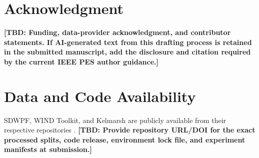 \documentclass[journal]{IEEEtran}
\newcommand{\TBD}[1]{\textbf{[TBD: #1]}}
\newcommand{\1}{\mathbb{I}}
\begin{document}
\section*{Acknowledgment}
\TBD{Funding, data-provider acknowledgment, and contributor statements. If AI-generated text from this drafting process is retained in the submitted manuscript, add the disclosure and citation required by the current IEEE PES author guidance.}

\section*{Data and Code Availability}
SDWPF, WIND Toolkit, and Kelmarsh are publicly available from their respective repositories \cite{zhou2024sdwpf,draxl2015windtoolkit,plumley2025kelmarsh}. \TBD{Provide repository URL/DOI for the exact processed splits, code release, environment lock file, and experiment manifests at submission.}



\end{document}
